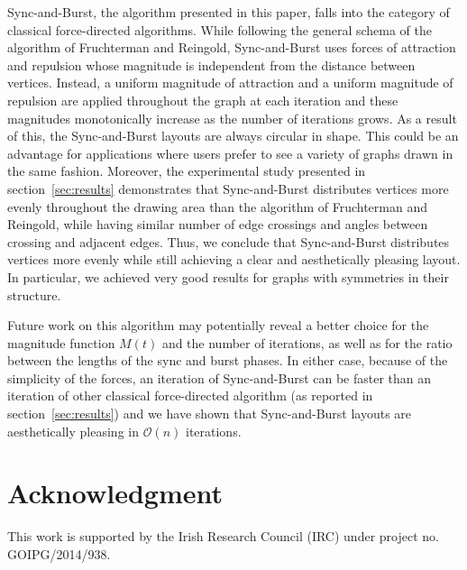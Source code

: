 \documentclass{llncs}
\begin{document}
Sync-and-Burst, the algorithm presented in this paper, falls into the category of classical force-directed algorithms. While following the general schema of the algorithm of Fruchterman and Reingold, Sync-and-Burst uses forces of attraction and repulsion whose magnitude is independent from the distance between vertices. Instead, a uniform magnitude of attraction and a uniform magnitude of repulsion are applied throughout the graph at each iteration and these magnitudes monotonically increase as the number of iterations grows. As a result of this, the Sync-and-Burst layouts are always circular in shape. This could be an advantage for applications where users prefer to see a variety of graphs drawn in the same fashion. Moreover, the experimental study presented in section~\ref{sec:results} demonstrates that Sync-and-Burst distributes vertices more evenly throughout the drawing area than the algorithm of Fruchterman and Reingold, while having similar number of edge crossings and angles between crossing and adjacent edges. Thus, we conclude that Sync-and-Burst distributes vertices more evenly while still achieving a clear and aesthetically pleasing layout. In particular, we achieved very good results for graphs with symmetries in their structure. 

Future work on this algorithm may potentially reveal a better choice for the magnitude function $M(t)$ and the number of iterations, as well as for the ratio between the lengths of the sync and burst phases. In either case, because of the simplicity of the forces, an iteration of Sync-and-Burst can be faster than an iteration of other classical force-directed algorithm (as reported in section~\ref{sec:results}) and we have shown that Sync-and-Burst layouts are aesthetically pleasing in $\mathcal{O}(n)$ iterations. 

\section*{Acknowledgment}

This work is supported by the Irish Research Council (IRC) under project no. GOIPG/2014/938.



\end{document}
